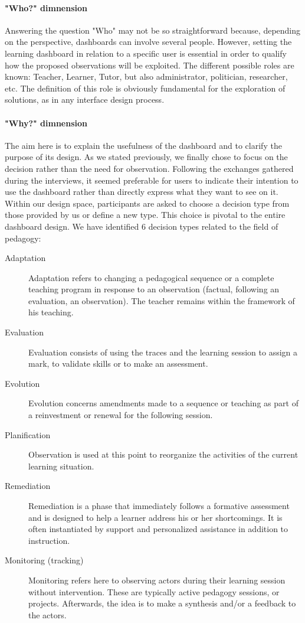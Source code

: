 \documentclass[manuscript,screen,nonacm,12pt]{acmart}
\begin{document}
\paragraph{"Who?" dimnension}
Answering the question "Who" may not be so straightforward because, depending on the perspective, dashboards can involve several people. However, setting the learning dashboard in relation to a specific user is essential in order to qualify how the proposed observations will be exploited. The different possible roles are known: Teacher, Learner, Tutor, but also administrator, politician, researcher, etc. The definition of this role is obviously fundamental for the exploration of solutions, as in any interface design process.
\paragraph{"Why?" dimnension}
The aim here is to explain the usefulness of the dashboard and to clarify the purpose of its design. As we stated previously, we finally chose to focus on the decision rather than the need for observation. Following the exchanges gathered during the interviews, it seemed preferable for users to indicate their intention to use the dashboard rather than directly express what they want to see on it. Within our design space, participants are asked to choose a decision type from those provided by us or define a new type. This choice is pivotal to the entire dashboard design. We have identified 6 decision types related to the field of pedagogy:
\begin{description}
    \item[Adaptation] Adaptation refers to changing a pedagogical sequence or a complete teaching program in response to an observation (factual, following an evaluation, an observation). The teacher remains within the framework of his teaching.
    \item[Evaluation] Evaluation consists of using the traces and the learning session to assign a mark, to validate skills or to make an assessment.
    \item[Evolution]  Evolution concerns amendments made to a sequence or teaching as part of a reinvestment or  renewal for the following session.
    \item[Planification] Observation is used at this point to reorganize the activities of the current learning situation.
    \item[Remediation] Remediation is a phase that immediately follows a formative assessment and is designed to help a learner address his or her shortcomings. It is often instantiated by support and personalized assistance in addition to instruction.
    \item[Monitoring (tracking)] Monitoring refers here to observing actors during their learning session without intervention. These are typically active pedagogy sessions, or projects. Afterwards, the idea is to make a synthesis and/or a feedback to the actors. 
\end{description}
\end{document}
